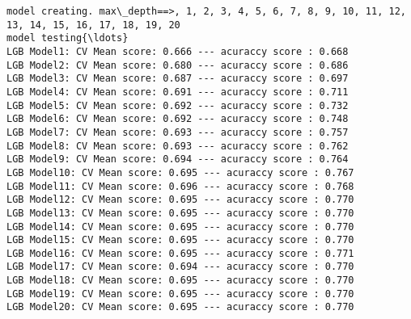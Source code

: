 \documentclass[11pt]{article}
\begin{document}
    \begin{Verbatim}[commandchars=\\\{\}]
model creating. max\_depth==>, 1, 2, 3, 4, 5, 6, 7, 8, 9, 10, 11, 12, 13, 14, 15, 16, 17, 18, 19, 20
model testing{\ldots}
LGB Model1: CV Mean score: 0.666 --- acuraccy score : 0.668
LGB Model2: CV Mean score: 0.680 --- acuraccy score : 0.686
LGB Model3: CV Mean score: 0.687 --- acuraccy score : 0.697
LGB Model4: CV Mean score: 0.691 --- acuraccy score : 0.711
LGB Model5: CV Mean score: 0.692 --- acuraccy score : 0.732
LGB Model6: CV Mean score: 0.692 --- acuraccy score : 0.748
LGB Model7: CV Mean score: 0.693 --- acuraccy score : 0.757
LGB Model8: CV Mean score: 0.693 --- acuraccy score : 0.762
LGB Model9: CV Mean score: 0.694 --- acuraccy score : 0.764
LGB Model10: CV Mean score: 0.695 --- acuraccy score : 0.767
LGB Model11: CV Mean score: 0.696 --- acuraccy score : 0.768
LGB Model12: CV Mean score: 0.695 --- acuraccy score : 0.770
LGB Model13: CV Mean score: 0.695 --- acuraccy score : 0.770
LGB Model14: CV Mean score: 0.695 --- acuraccy score : 0.770
LGB Model15: CV Mean score: 0.695 --- acuraccy score : 0.770
LGB Model16: CV Mean score: 0.695 --- acuraccy score : 0.771
LGB Model17: CV Mean score: 0.694 --- acuraccy score : 0.770
LGB Model18: CV Mean score: 0.695 --- acuraccy score : 0.770
LGB Model19: CV Mean score: 0.695 --- acuraccy score : 0.770
LGB Model20: CV Mean score: 0.695 --- acuraccy score : 0.770

    \end{Verbatim}

    \begin{center}
    \end{center}
    { \hspace*{\fill} \\}
    
\end{document}
